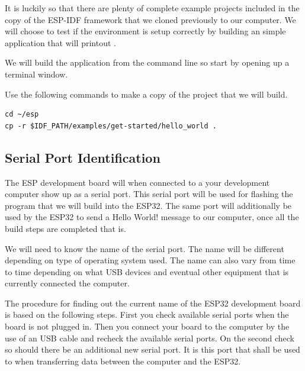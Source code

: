 \documentclass{tufte-book}
\begin{document}
It is luckily so that there are plenty of complete example projects included in the copy of the ESP-IDF framework that we cloned previously to our computer. We will choose to test if the environment is setup correctly by building an simple application that will printout .

We will build the application from the command line so start by opening up a terminal window.


Use the following commands to make a copy of the project that we will build.

\begin{lstlisting}
cd ~/esp
cp -r $IDF_PATH/examples/get-started/hello_world .
\end{lstlisting}

\subsection{Serial Port Identification}


The ESP development board will when connected to a your development computer show up as a serial port. This serial port will be used for flashing the program that we will build into the ESP32. The same port will additionally be used by the ESP32 to send a Hello World! message to our computer, once all the build steps are completed that is.

We will need to know the name of the serial port. The name will be different depending on type of operating system used. The name can also vary from time to time depending on what USB devices and eventual other equipment that is currently connected the computer.

The procedure for finding out the current name of the ESP32 development board is based on the following steps. First you check available serial ports when the board is not plugged in. Then you connect your board to the computer by the use of an USB cable and recheck the available serial ports. On the second check so should there be an additional new serial port. It is this port that shall be used to when transferring data between the computer and the ESP32.
\end{document}
